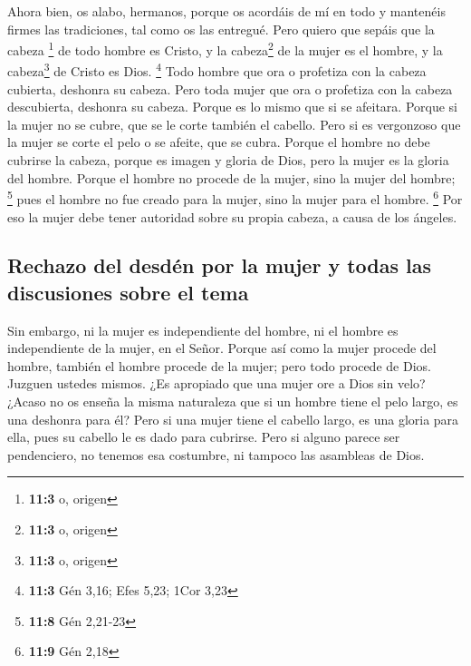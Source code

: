 \begin{paracol}{2}
 Ahora bien, os alabo, hermanos, porque os acordáis de mí
en todo y mantenéis firmes las tradiciones, tal como os las entregué.
 Pero quiero que sepáis que la cabeza \footnote{\textbf{11:3}
  o, origen} de todo hombre es Cristo, y la cabeza\footnote{\textbf{11:3}
  o, origen} de la mujer es el hombre, y la cabeza\footnote{\textbf{11:3}
  o, origen} de Cristo es Dios. \footnote{\textbf{11:3} Gén 3,16; Efes
  5,23; 1Cor 3,23}  Todo hombre que ora o profetiza con la
cabeza cubierta, deshonra su cabeza.  Pero toda mujer que
ora o profetiza con la cabeza descubierta, deshonra su cabeza. Porque es
lo mismo que si se afeitara.  Porque si la mujer no se
cubre, que se le corte también el cabello. Pero si es vergonzoso que la
mujer se corte el pelo o se afeite, que se cubra.  Porque
el hombre no debe cubrirse la cabeza, porque es imagen y gloria de Dios,
pero la mujer es la gloria del hombre.  Porque el hombre
no procede de la mujer, sino la mujer del hombre; \footnote{\textbf{11:8}
  Gén 2,21-23}  pues el hombre no fue creado para la
mujer, sino la mujer para el hombre. \footnote{\textbf{11:9} Gén 2,18}
 Por eso la mujer debe tener autoridad sobre su propia
cabeza, a causa de los ángeles.

\hypertarget{rechazo-del-desduxe9n-por-la-mujer-y-todas-las-discusiones-sobre-el-tema}{%
\subsection{Rechazo del desdén por la mujer y todas las discusiones
sobre el
tema}\label{rechazo-del-desduxe9n-por-la-mujer-y-todas-las-discusiones-sobre-el-tema}}

 Sin embargo, ni la mujer es independiente del hombre, ni
el hombre es independiente de la mujer, en el Señor. 
Porque así como la mujer procede del hombre, también el hombre procede
de la mujer; pero todo procede de Dios.  Juzguen ustedes
mismos. ¿Es apropiado que una mujer ore a Dios sin velo? 
¿Acaso no os enseña la misma naturaleza que si un hombre tiene el pelo
largo, es una deshonra para él?  Pero si una mujer tiene
el cabello largo, es una gloria para ella, pues su cabello le es dado
para cubrirse.  Pero si alguno parece ser pendenciero, no
tenemos esa costumbre, ni tampoco las asambleas de Dios.

\hypertarget{seria-reprimenda-por-los-agravios-en-las-comidas-comunes-e-instrucciones-para-la-celebraciuxf3n-digna-de-la-cena-del-seuxf1or}{%
}
\end{paracol}
